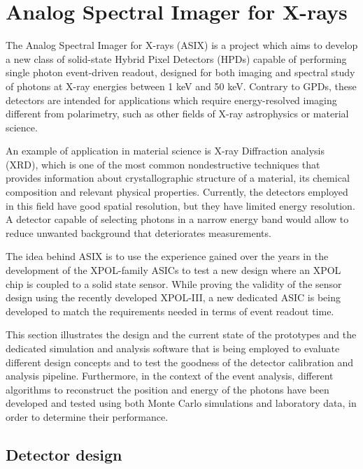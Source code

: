 \chapter{Analog Spectral Imager for X-rays}
\label{chap:chapter4}

The Analog Spectral Imager for X-rays (ASIX) is a project which aims to develop a new class of solid-state Hybrid Pixel Detectors (HPDs) capable of performing single photon event-driven readout, designed for both imaging and spectral study of photons at X-ray energies between 1 keV and 50 keV. Contrary to GPDs, these detectors are intended for applications which require energy-resolved imaging different from polarimetry, such as other fields of X-ray astrophysics or material science.

An example of application in material science is X-ray Diffraction analysis (XRD), which is one of the most common nondestructive techniques that provides information about crystallographic structure of a material, its chemical composition and relevant physical properties. Currently, the detectors employed in this field have good spatial resolution, but they have limited energy resolution. A detector capable of selecting photons in a narrow energy band would allow to reduce unwanted background that deteriorates measurements.

The idea behind ASIX is to use the experience gained over the years in the development of the XPOL-family ASICs to test a new design where an XPOL chip is coupled to a solid state sensor. While proving the validity of the sensor design using the recently developed XPOL-III, a new dedicated ASIC is being developed to match the requirements needed in terms of event readout time.

This section illustrates the design and the current state of the prototypes and the dedicated simulation and analysis software that is being employed to evaluate different design concepts and to test the goodness of the detector calibration and analysis pipeline. Furthermore, in the context of the event analysis, different algorithms to reconstruct the position and energy of the photons have been developed and tested using both Monte Carlo simulations and laboratory data, in order to determine their performance.

\section{Detector design}
\label{sec:asix_design}

